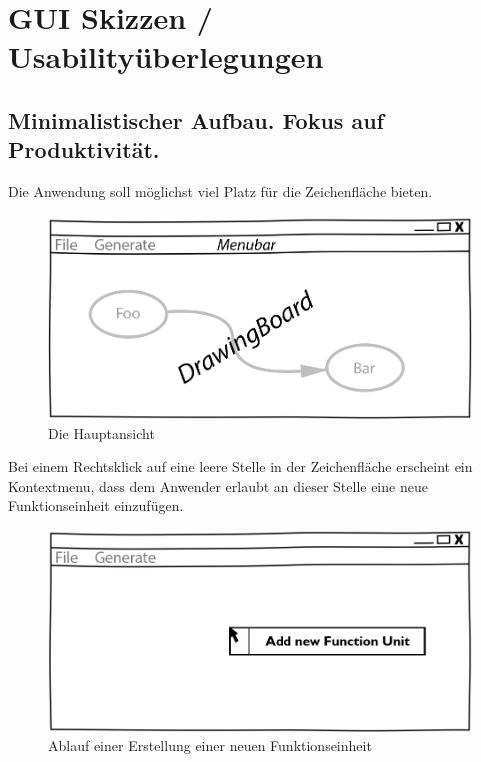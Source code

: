 \pagebreak
\chapter{GUI Skizzen / Usabilityüberlegungen}


\section{Minimalistischer Aufbau. Fokus auf Produktivität.}

Die Anwendung soll möglichst viel Platz für die Zeichenfläche
bieten.

\begin{figure}[H]
	\centering
\includegraphics[width=.9\linewidth]{./img/MainCrop.jpg}
	\caption{Die Hauptansicht}
\end{figure}

Bei einem Rechtsklick auf eine leere Stelle in der Zeichenfläche erscheint ein Kontextmenu, dass dem Anwender erlaubt an dieser Stelle eine neue Funktionseinheit einzufügen.

\begin{figure}[H]
	\centering
	\includegraphics[width=.9\linewidth]{./img/ContextMenu.jpg}
	\caption{Ablauf einer Erstellung einer neuen Funktionseinheit}
\end{figure}


